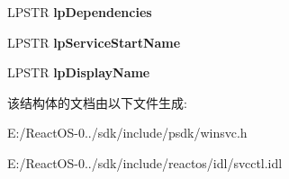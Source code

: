 \begin{DoxyCompactItemize}
L\+P\+S\+TR {\bfseries lp\+Dependencies}
\item 
\mbox{\label{struct___q_u_e_r_y___s_e_r_v_i_c_e___c_o_n_f_i_g_a_aaeb2444239132d6734dda4da4b45696f}} 
L\+P\+S\+TR {\bfseries lp\+Service\+Start\+Name}
\item 
\mbox{\label{struct___q_u_e_r_y___s_e_r_v_i_c_e___c_o_n_f_i_g_a_aece0f109fd6a43a601b8bc0771d3b9bb}} 
L\+P\+S\+TR {\bfseries lp\+Display\+Name}
\end{DoxyCompactItemize}


该结构体的文档由以下文件生成\+:\begin{DoxyCompactItemize}
\item 
E\+:/\+React\+O\+S-\/0../sdk/include/psdk/winsvc.\+h\item 
E\+:/\+React\+O\+S-\/0../sdk/include/reactos/idl/svcctl.\+idl\end{DoxyCompactItemize}
